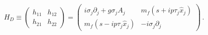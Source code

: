 \begin{equation}
H_D \equiv \left( \begin{array}{cc} h_{11} & h_{12} \\ h_{21} & h_{22} 
\end{array} \right)  = \left( \begin{array}{cc} i\sigma_j\partial_j + 
g\sigma_jA_j & m_f(s+ip\tau_j\hat{x}_j ) \\ m_f(s-ip\tau_j\hat{x}_j ) & 
-i\sigma_j\partial_j \end{array} \right) \, .
\end{equation} 
